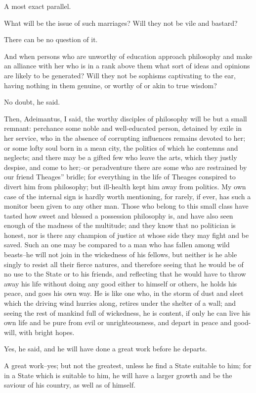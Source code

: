 A most exact parallel.

What will be the issue of such marriages? Will they not be vile and
bastard?

There can be no question of it.

And when persons who are unworthy of education approach philosophy and
make an alliance with her who is in a rank above them what sort of
ideas and opinions are likely to be generated? Will they not be sophisms
captivating to the ear, having nothing in them genuine, or worthy of or
akin to true wisdom?

No doubt, he said.

Then, Adeimantus, I said, the worthy disciples of philosophy will be but
a small remnant: perchance some noble and well-educated person, detained
by exile in her service, who in the absence of corrupting influences
remains devoted to her; or some lofty soul born in a mean city, the
politics of which he contemns and neglects; and there may be a gifted
few who leave the arts, which they justly despise, and come to her;--or
peradventure there are some who are restrained by our friend Theages''
bridle; for everything in the life of Theages conspired to divert him
from philosophy; but ill-health kept him away from politics. My own case
of the internal sign is hardly worth mentioning, for rarely, if ever,
has such a monitor been given to any other man. Those who belong to this
small class have tasted how sweet and blessed a possession philosophy
is, and have also seen enough of the madness of the multitude; and they
know that no politician is honest, nor is there any champion of justice
at whose side they may fight and be saved. Such an one may be compared
to a man who has fallen among wild beasts--he will not join in the
wickedness of his fellows, but neither is he able singly to resist all
their fierce natures, and therefore seeing that he would be of no use to
the State or to his friends, and reflecting that he would have to throw
away his life without doing any good either to himself or others, he
holds his peace, and goes his own way. He is like one who, in the storm
of dust and sleet which the driving wind hurries along, retires
under the shelter of a wall; and seeing the rest of mankind full of
wickedness, he is content, if only he can live his own life and be pure
from evil or unrighteousness, and depart in peace and good-will, with
bright hopes.

Yes, he said, and he will have done a great work before he departs.

A great work--yes; but not the greatest, unless he find a State suitable
to him; for in a State which is suitable to him, he will have a larger
growth and be the saviour of his country, as well as of himself.

